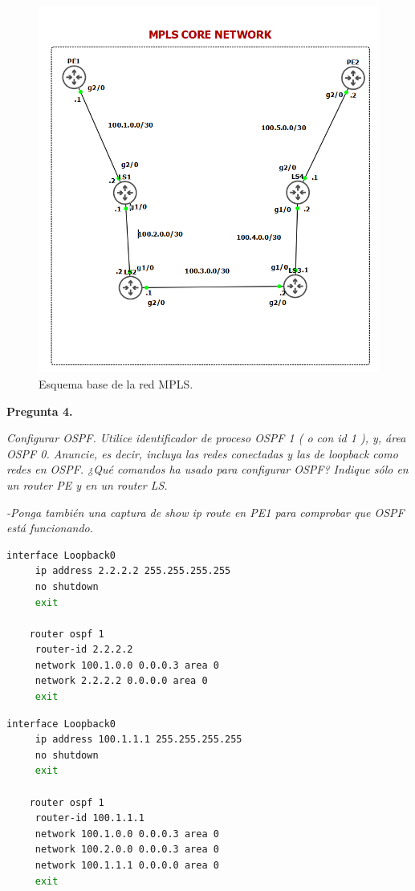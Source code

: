 \documentclass[a4paper, 12pt]{report}
\begin{document}
\begin{figure}[H]
	\centering
	\includegraphics[scale=0.5]{baseMPLS.png}
	\caption{Esquema base de la red MPLS.}
	\label{fig:baseMPLS}
\end{figure}


\textbf{Pregunta 4.}

\textit{Configurar OSPF. Utilice identificador de proceso OSPF 1 ( o con id 1 ), y, área OSPF 0. Anuncie, es decir, incluya las redes conectadas y las de loopback como redes en OSPF. ¿Qué comandos ha usado para configurar OSPF? Indique sólo en un router PE y en un router LS.}

\textit{-Ponga también una captura de show ip route en PE1 para comprobar que OSPF está funcionando.}


\newpage
\begin{lstlisting}[language=bash, caption={Configuración OSPF en el Router PE1}]
    interface Loopback0
     ip address 2.2.2.2 255.255.255.255
     no shutdown
     exit
    
    router ospf 1
     router-id 2.2.2.2
     network 100.1.0.0 0.0.0.3 area 0
     network 2.2.2.2 0.0.0.0 area 0
     exit
\end{lstlisting}

\begin{lstlisting}[language=bash, caption={Configuración OSPF en el Router LS1}]
    interface Loopback0
     ip address 100.1.1.1 255.255.255.255
     no shutdown
     exit
    
    router ospf 1
     router-id 100.1.1.1
     network 100.1.0.0 0.0.0.3 area 0
     network 100.2.0.0 0.0.0.3 area 0
     network 100.1.1.1 0.0.0.0 area 0
     exit
\end{lstlisting}
\end{document}
